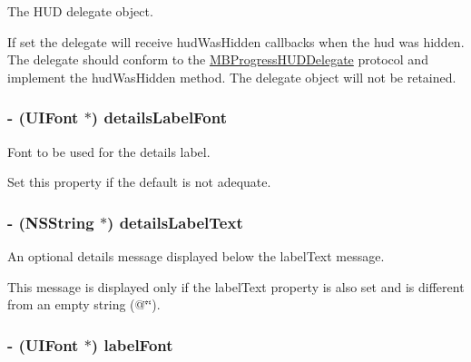 The HUD delegate object. 

If set the delegate will receive hudWasHidden callbacks when the hud was hidden. The delegate should conform to the \hyperlink{protocol_m_b_progress_h_u_d_delegate-p}{MBProgressHUDDelegate} protocol and implement the hudWasHidden method. The delegate object will not be retained. \hypertarget{interface_m_b_progress_h_u_d_f3a772e02286bf867c2b4c2213be0180}{
\subsubsection[{detailsLabelFont}]{\setlength{\rightskip}{0pt plus 5cm}- (UIFont $\ast$) detailsLabelFont}}
\label{interface_m_b_progress_h_u_d_f3a772e02286bf867c2b4c2213be0180}


Font to be used for the details label. 

Set this property if the default is not adequate. \hypertarget{interface_m_b_progress_h_u_d_b5ad528a731e513b39e3183129af1f37}{
\subsubsection[{detailsLabelText}]{\setlength{\rightskip}{0pt plus 5cm}- (NSString $\ast$) detailsLabelText}}
\label{interface_m_b_progress_h_u_d_b5ad528a731e513b39e3183129af1f37}


An optional details message displayed below the labelText message. 

This message is displayed only if the labelText property is also set and is different from an empty string (@\char`\"{}\char`\"{}). \hypertarget{interface_m_b_progress_h_u_d_85b03f18b8313f4c3efc2002ad79ff27}{
\subsubsection[{labelFont}]{\setlength{\rightskip}{0pt plus 5cm}- (UIFont $\ast$) labelFont}}
\label{interface_m_b_progress_h_u_d_85b03f18b8313f4c3efc2002ad79ff27}


